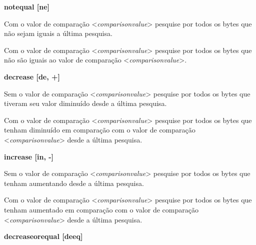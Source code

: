 \documentclass[letterpaper,10pt,brazil]{sphinxmanual}
\begin{document}
\begin{DUlineblock}{0em}
\begin{DUlineblock}{\DUlineblockindent}
\item[] \textbf{notequal {[}ne{]}}
\item[] 
\end{DUlineblock}
\item[] Com o valor de comparação \textless{}\emph{comparisonvalue}\textgreater{} pesquise por todos os bytes que não sejam iguais a última pesquisa.
\item[] Com o valor de comparação \textless{}\emph{comparisonvalue}\textgreater{} pesquise por todos os bytes que não são iguais ao valor de comparação \textless{}\emph{comparisonvalue}\textgreater{}.
\item[] 
\item[]
\begin{DUlineblock}{\DUlineblockindent}
\item[] \textbf{decrease {[}de, +{]}}
\item[] 
\end{DUlineblock}
\item[] Sem o valor de comparação \textless{}\emph{comparisonvalue}\textgreater{} pesquise por todos os bytes que tiveram seu valor diminuído desde a última pesquisa.
\item[] Com o valor de comparação \textless{}\emph{comparisonvalue}\textgreater{} pesquise por todos os bytes que tenham diminuído em comparação com o valor de comparação \textless{}\emph{comparisonvalue}\textgreater{} desde a última pesquisa.
\item[] 
\item[]
\begin{DUlineblock}{\DUlineblockindent}
\item[] \textbf{increase {[}in, -{]}}
\item[] 
\end{DUlineblock}
\item[] Sem o valor de comparação \textless{}\emph{comparisonvalue}\textgreater{} pesquise por todos os bytes que tenham aumentando desde a última pesquisa.
\item[] Com o valor de comparação \textless{}\emph{comparisonvalue}\textgreater{} pesquise por todos os bytes que tenham aumentado em comparação com o valor de comparação \textless{}\emph{comparisonvalue}\textgreater{} desde a última pesquisa.
\item[] 
\item[]
\begin{DUlineblock}{\DUlineblockindent}
\item[] \textbf{decreaseorequal {[}deeq{]}}
\item[] 

\end{DUlineblock}
\end{DUlineblock}
\end{document}
